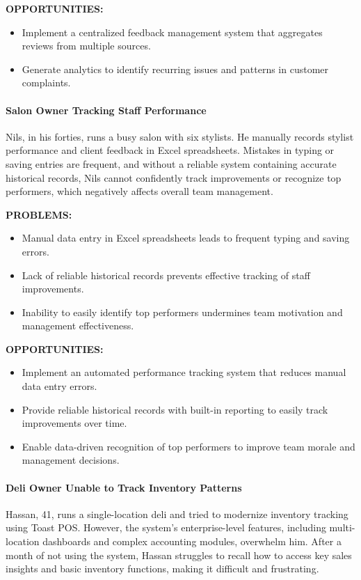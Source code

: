 \documentclass[]{VUMIFTemplateClass}
\newcommand{\subsubsubsection}[1]{\paragraph{#1}}
\begin{document}
\textbf{OPPORTUNITIES:}
\begin{itemize}
    \item Implement a centralized feedback management system that aggregates reviews from multiple sources.
    \item Generate analytics to identify recurring issues and patterns in customer complaints.
\end{itemize}

\subsubsubsection{Salon Owner Tracking Staff Performance}
\label{subsubsubsec:owner-staff-performance}

Nils, in his forties, runs a busy salon with six stylists. He manually records
stylist performance and client feedback in Excel spreadsheets. Mistakes in
typing or saving entries are frequent, and without a reliable system containing
accurate historical records, Nils cannot confidently track improvements or recognize top performers, which negatively affects overall team management.

\textbf{PROBLEMS:}
\begin{itemize}
    \item Manual data entry in Excel spreadsheets leads to frequent typing and saving errors.
    \item Lack of reliable historical records prevents effective tracking of staff improvements.
    \item Inability to easily identify top performers undermines team motivation and management effectiveness.
\end{itemize}

\textbf{OPPORTUNITIES:}
\begin{itemize}
    \item Implement an automated performance tracking system that reduces manual data entry errors.
    \item Provide reliable historical records with built-in reporting to easily track improvements over time.
    \item Enable data-driven recognition of top performers to improve team morale and management decisions.
\end{itemize}

\subsubsubsection{Deli Owner Unable to Track Inventory Patterns}
\label{subsubsubsec:deli-inventory}

Hassan, 41, runs a single-location deli and tried to modernize inventory tracking using Toast POS. However, the system’s enterprise-level features, including multi-location dashboards and complex accounting modules, overwhelm him. After a month of not using the system, Hassan struggles to recall how to access key sales insights and basic inventory functions, making it difficult and frustrating.
\end{document}
